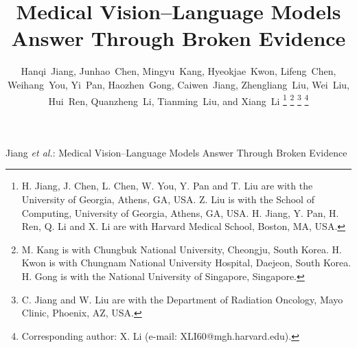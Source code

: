 

\title{Medical Vision--Language Models\\
Answer Through Broken Evidence}

\author{Hanqi~Jiang, Junhao~Chen, Mingyu~Kang, Hyeokjae~Kwon, Lifeng~Chen, Weihang~You, Yi~Pan, Haozhen~Gong, Caiwen~Jiang, Zhengliang~Liu, Wei~Liu, Hui~Ren, Quanzheng~Li, Tianming~Liu, and Xiang~Li
\versionthanks
\thanks{H. Jiang, J. Chen, L. Chen, W. You, Y. Pan and T. Liu are with the
University of Georgia, Athens, GA, USA. Z. Liu is with the School of
Computing, University of Georgia, Athens, GA, USA. H. Jiang, Y. Pan, H. Ren,
Q. Li and X. Li are with Harvard Medical School, Boston, MA, USA.}
\thanks{M. Kang is with Chungbuk National University, Cheongju, South Korea.
H. Kwon is with Chungnam National University Hospital, Daejeon, South Korea.
H. Gong is with the National University of Singapore, Singapore.}
\thanks{C. Jiang and W. Liu are with the Department of Radiation Oncology,
Mayo Clinic, Phoenix, AZ, USA.}
\thanks{Corresponding author: X. Li (e-mail: XLI60@mgh.harvard.edu).}}

\markboth{\runninghead}%
{Jiang \MakeLowercase{\textit{et al.}}: Medical Vision--Language Models Answer Through Broken Evidence}

\maketitle


